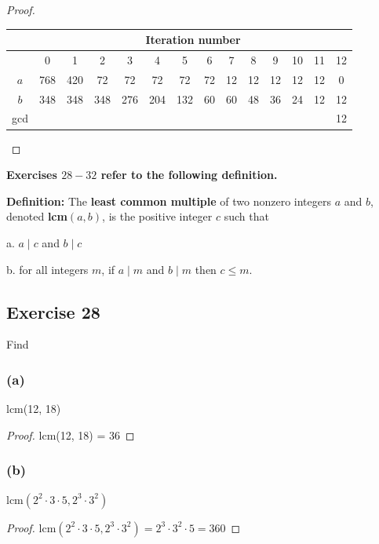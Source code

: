 \documentclass[14pt]{extarticle}
\newcommand{\cy}{\color{cyan}}
\begin{document}
\begin{proof}
\begin{center}
\begin{tabular}{|c|c|c|c|c|c|c|c|c|c|c|c|c|c|}
\hline
    & \multicolumn{13}{c|}{{\bf \cy Iteration number}} \\
\hline
    & 0 & 1 & 2 & 3 & 4 & 5 &6 &7 &8 &9 &10&11&12 \\
\hline
$a$ &768&420& 72& 72& 72& 72&72&12&12&12&12&12&0  \\
\hline
$b$ &348&348&348&276&204&132&60&60&48&36&24&12&12 \\
\hline
gcd &   &   &   &   &   &   &  &  &  &  &  &  &12 \\
\hline
\end{tabular}
\end{center}
\end{proof}

{\bf \cy Exercises $28-32$ refer to the following definition.}

\begin{tcolorbox}[colframe=cyan]
{\bf \cy Definition:} The {\bf least common multiple} of two nonzero integers $a$ and $b$, denoted {\bf lcm}$(a, b)$, is the positive integer $c$ such that

a. $a \mid c$ and $b \mid c$

b. for all integers $m$, if $a \mid m$ and $b \mid m$ then $c \leq m$.
\end{tcolorbox}

\subsection{Exercise 28}
Find

\subsubsection{(a)}
lcm(12, 18)

\begin{proof}
lcm(12, 18) = 36
\end{proof}

\subsubsection{(b)}
lcm$(2^2 \cdot 3 \cdot 5, 2^3 \cdot 3^2)$

\begin{proof}
lcm$(2^2 \cdot 3 \cdot 5, 2^3 \cdot 3^2) = 2^3\cdot 3^2 \cdot 5 = 360$
\end{proof}
\end{document}
